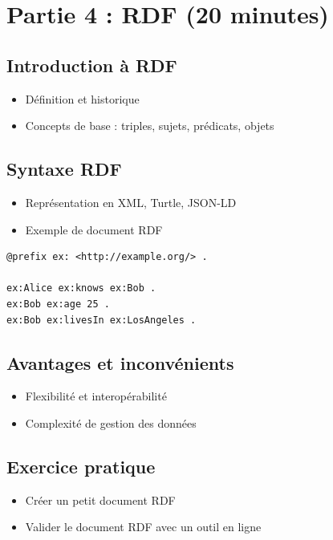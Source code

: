 \documentclass{article}
\begin{document}
\section{Partie 4 : RDF (20 minutes)}
\subsection{Introduction à RDF}
\begin{itemize}
    \item Définition et historique
    \item Concepts de base : triples, sujets, prédicats, objets
\end{itemize}

\subsection{Syntaxe RDF}
\begin{itemize}
    \item Représentation en XML, Turtle, JSON-LD
    \item Exemple de document RDF
\end{itemize}

\begin{lstlisting}[language=Turtle, caption=Exemple de document RDF en Turtle]
@prefix ex: <http://example.org/> .

ex:Alice ex:knows ex:Bob .
ex:Bob ex:age 25 .
ex:Bob ex:livesIn ex:LosAngeles .
\end{lstlisting}

\subsection{Avantages et inconvénients}
\begin{itemize}
    \item Flexibilité et interopérabilité
    \item Complexité de gestion des données
\end{itemize}

\subsection{Exercice pratique}
\begin{itemize}
    \item Créer un petit document RDF
    \item Valider le document RDF avec un outil en ligne
\end{itemize}
\end{document}
